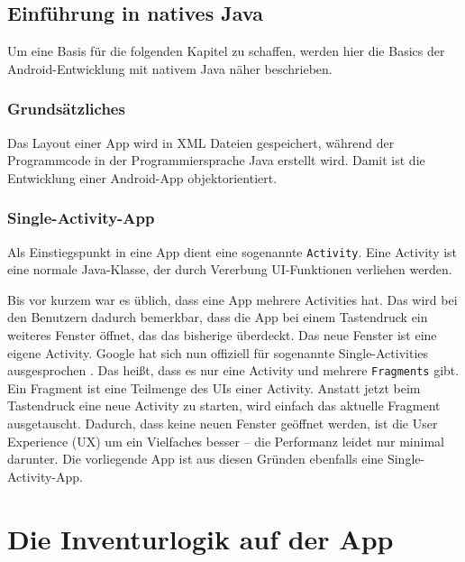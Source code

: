 \hypertarget{einfuxfchrung-in-natives-java}{%
\section{Einführung in natives
Java}\label{einfuxfchrung-in-natives-java}}

Um eine Basis für die folgenden Kapitel zu schaffen, werden hier die
Basics der Android-Entwicklung mit nativem Java näher beschrieben.

\hypertarget{grundsuxe4tzliches}{%
\subsection{Grundsätzliches}\label{grundsuxe4tzliches}}

Das Layout einer App wird in XML Dateien gespeichert, während der
Programmcode in der Programmiersprache Java erstellt wird. Damit ist die
Entwicklung einer Android-App objektorientiert.

\hypertarget{single-activity-app}{%
\subsection{Single-Activity-App}\label{single-activity-app}}

Als Einstiegspunkt in eine App dient eine sogenannte \texttt{Activity}.
Eine Activity ist eine normale Java-Klasse, der durch Vererbung
UI-Funktionen verliehen werden.

Bis vor kurzem war es üblich, dass eine App mehrere Activities hat. Das
wird bei den Benutzern dadurch bemerkbar, dass die App \zB bei einem
Tastendruck ein weiteres Fenster öffnet, das das bisherige überdeckt.
Das neue Fenster ist eine eigene Activity. Google hat sich nun offiziell
für sogenannte Single-Activities ausgesprochen \cite{single-activity}.
Das heißt, dass es nur eine Activity und mehrere \texttt{Fragments}
gibt. Ein Fragment ist eine Teilmenge des UIs \bzw einer Activity.
Anstatt jetzt beim Tastendruck eine neue Activity zu starten, wird
einfach das aktuelle Fragment ausgetauscht. Dadurch, dass keine neuen
Fenster geöffnet werden, ist die User Experience (UX) um ein Vielfaches
besser -- die Performanz leidet nur minimal darunter. Die vorliegende
App ist aus diesen Gründen ebenfalls eine Single-Activity-App.

\chapter{Die Inventurlogik auf der App}
\label{inventurlogik_auf_der_app}

